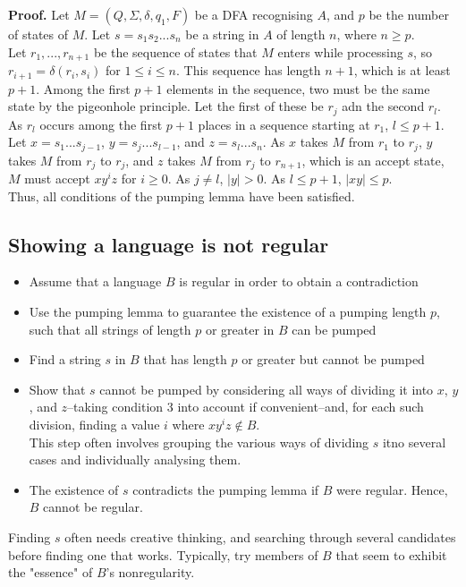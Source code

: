 \documentclass{article}
\begin{document}
\textbf{Proof.} Let $M = (Q, \Sigma, \delta, q_1, F)$ be a DFA recognising $A$, and $p$ be the number of states of $M$. Let $s = s_1s_2...s_n$ be a string in $A$ of length $n$, where $n \geq p$.\medskip
\\ Let $r_1, ..., r_{n+1}$ be the sequence of states that $M$ enters while processing $s$, so $r_{i+1} = \delta(r_i, s_i)$ for $1 \leq i \leq n$. This sequence has length $n+1$, which is at least $p+1$. Among the first $p+1$ elements in the sequence, two must be the same state by the pigeonhole principle. Let the first of these be $r_j$ adn the second $r_l$. As $r_l$ occurs among the first $p+1$ places in a sequence starting at $r_1$, $l \leq p + 1$.\medskip
\\ Let $x = s_1...s_{j-1}$, $y=s_j...s_{l-1}$, and $z=s_l...s_n$. As $x$ takes $M$ from $r_1$ to $r_j$, $y$ takes $M$ from $r_j$ to $r_j$, and $z$ takes $M$ from $r_j$ to $r_{n+1}$, which is an accept state, $M$ must accept $xy^iz$ for $i \geq 0$. As $j \neq l$, $|y| > 0$. As $l \leq p + 1$, $|xy| \leq p$.\medskip
\\ Thus, all conditions of the pumping lemma have been satisfied.

\subsection{Showing a language is not regular}
\begin{itemize}
	\item Assume that a language $B$ is regular in order to obtain a contradiction
	\item Use the pumping lemma to guarantee the existence of a pumping length $p$, such that all strings of length $p$ or greater in $B$ can be pumped
	\item Find a string $s$ in $B$ that has length $p$ or greater but cannot be pumped
	\item Show that $s$ cannot be pumped by considering all ways of dividing it into $x$, $y$, and $z$--taking condition 3 into account if convenient--and, for each such division, finding a value $i$ where $xy^iz \notin B$.
	\\ This step often involves grouping the various ways of dividing $s$ itno several cases and individually analysing them.
	\item The existence of $s$ contradicts the pumping lemma if $B$ were regular. Hence, $B$ cannot be regular.
\end{itemize}
Finding $s$ often needs creative thinking, and searching through several candidates before finding one that works. Typically, try members of $B$ that seem to exhibit the "essence" of $B$'s nonregularity.
\end{document}
